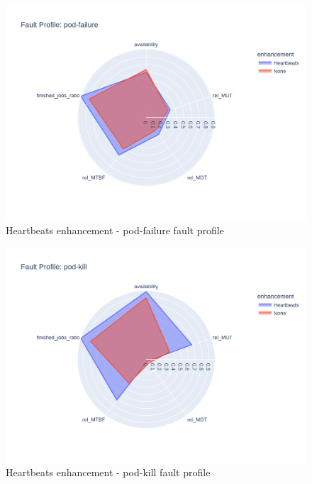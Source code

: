 \begin{figure}[h]
	\centering
	\includegraphics[width=140mm, keepaspectratio]{figures/heartbeats_with_base_pod-failure.png}
	\caption{Heartbeats enhancement - pod-failure fault profile}
	\label{fig:heartbeats-results-pod-failure}
\end{figure}

\begin{figure}[h]
	\centering
	\includegraphics[width=140mm, keepaspectratio]{figures/heartbeats_with_base_pod-kill.png}
	\caption{Heartbeats enhancement - pod-kill fault profile}
	\label{fig:heartbeats-results-pod-kill}
\end{figure}
